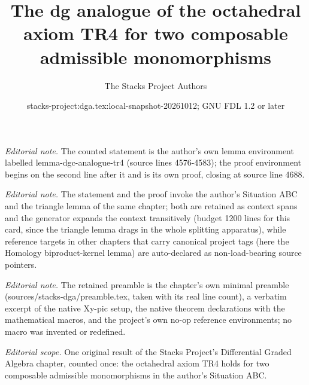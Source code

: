 \documentclass{stacks-project}
\title{The dg analogue of the octahedral axiom TR4 for two composable admissible monomorphisms}
\author{The Stacks Project Authors}
\date{stacks-project:dga.tex:local-snapshot-20261012; GNU FDL 1.2 or later}
\theoremstyle{plain}
\theoremstyle{definition}
\theoremstyle{remark}
\numberwithin{equation}{subsection}
\begin{document}
\maketitle
\noindent\textit{Editorial note.} The counted statement is the author's own lemma environment labelled lemma-dgc-analogue-tr4 (source lines 4576-4583); the proof environment begins on the second line after it and is its own proof, closing at source line 4688.\par\medskip
\noindent\textit{Editorial note.} The statement and the proof invoke the author's Situation ABC and the triangle lemma of the same chapter; both are retained as context spans and the generator expands the context transitively (budget 1200 lines for this card, since the triangle lemma drags in the whole splitting apparatus), while reference targets in other chapters that carry canonical project tags (here the Homology biproduct-kernel lemma) are auto-declared as non-load-bearing source pointers.\par\medskip
\noindent\textit{Editorial note.} The retained preamble is the chapter's own minimal preamble (sources/stacks-dga/preamble.tex, taken with its real line count), a verbatim excerpt of the native Xy-pic setup, the native theorem declarations with the mathematical macros, and the project's own no-op reference environments; no macro was invented or redefined.\par\medskip
\noindent\textit{Editorial scope.} One original result of the Stacks Project's Differential Graded Algebra chapter, counted once: the octahedral axiom TR4 holds for two composable admissible monomorphisms in the author's Situation ABC.\par\medskip
\end{document}
